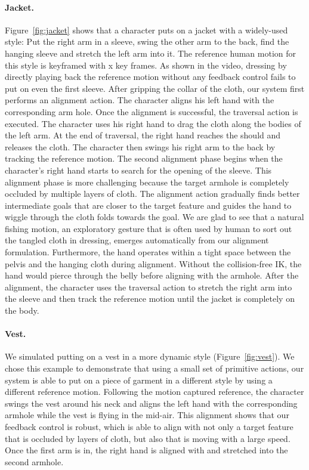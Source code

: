 \paragraph{Jacket.} Figure~\ref{fig:jacket} shows that a character puts on a jacket with a widely-used style: Put the right arm in a sleeve, swing the other arm to the back, find the hanging sleeve and stretch the left arm into it. The reference human motion for this style is keyframed with x key frames. As shown in the video, dressing by directly playing back the reference motion without any feedback control fails to put on even the first sleeve. After gripping the collar of the cloth, our system first performs an alignment action. The character aligns his left hand with the corresponding arm hole. Once the alignment is successful, the traversal action is executed. The character uses his right hand to drag the cloth along the bodies of the left arm. At the end of traversal, the right hand reaches the should and releases the cloth. The character then swings his right arm to the back by tracking the reference motion. The second alignment phase begins when the character's right hand starts to search for the opening of the sleeve. This alignment phase is more challenging because the target armhole is completely occluded by multiple layers of cloth. The alignment action gradually finds better intermediate goals that are closer to the target feature and guides the hand to wiggle through the cloth folds towards the goal. We are glad to see that a natural fishing motion, an exploratory gesture that is often used by human to sort out the tangled cloth in dressing, emerges automatically from our alignment formulation. Furthermore, the hand operates within a tight space between the pelvis and the hanging cloth during alignment. Without the collision-free IK, the hand would pierce through the belly before aligning with the armhole. After the alignment, the character uses the traversal action to stretch the right arm into the sleeve and then track the reference motion until the jacket is completely on the body.

\paragraph{Vest.} We simulated putting on a vest in a more dynamic style (Figure~\ref{fig:vest}). We chose this example to demonstrate that using a small set of primitive actions, our system is able to put on a piece of garment in a different style by using a different reference motion. Following the motion captured reference, the character swings the vest around his neck and aligns the left hand with the corresponding armhole while the vest is flying in the mid-air. This alignment shows that our feedback control is robust, which is able to align with not only a target feature that is occluded by layers of cloth, but also that is moving with a large speed. Once the first arm is in, the right hand is aligned with and stretched into the second armhole. 

